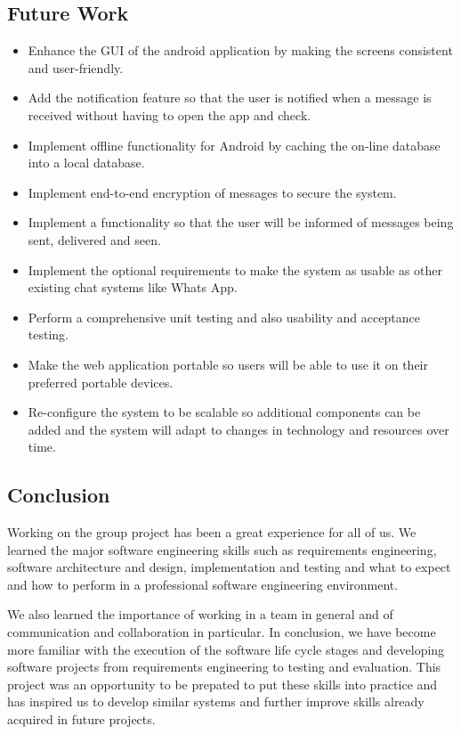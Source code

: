 \documentclass{article}
\begin{document}
\subsection{Future Work}
\begin{itemize}
\item Enhance the GUI of the android application by making the screens consistent and user-friendly. 
\item Add the notification feature so that the user is notified when a message is received without having to open the app and check. 
\item Implement offline functionality for Android by caching the on-line database into a local database. 
\item Implement end-to-end encryption of messages to secure the system. 
\item Implement a functionality so that the user will be informed of messages being sent, delivered and seen. 
\item Implement the optional requirements to make the system as usable as other existing chat systems like Whats App. 
\item Perform a comprehensive unit testing and also usability and acceptance testing. 
\item Make the web application portable so users will be able to use it on their preferred portable devices. 
\item Re-configure the system to be scalable so additional components can be added and the system will adapt to changes in technology and resources over time. 
\end{itemize}

\subsection{Conclusion}
Working on the group project has been a great experience for all of us. We learned the major software engineering skills such as requirements engineering, software architecture and design, implementation and testing and what to expect and how to perform in a professional software engineering environment. \par
We also learned the importance of working in a team in general and of communication and collaboration in particular. In conclusion, we have become more familiar with the execution of the software life cycle stages and developing software projects from requirements engineering to testing and evaluation. This project was an opportunity to be prepated to put these skills into practice and has inspired us to develop similar systems and further improve skills already acquired in future projects. 
\end{document}
